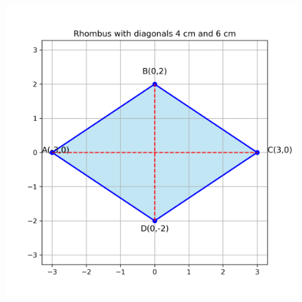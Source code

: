 \documentclass[journal]{IEEEtran}
\begin{document}
\begin{figure}[h!]
    \centering
    \includegraphics[height=0.5\textheight, keepaspectratio]{figs/rhombus.png}
    \label{figure_1}
\end{figure}
 
\end{document}
